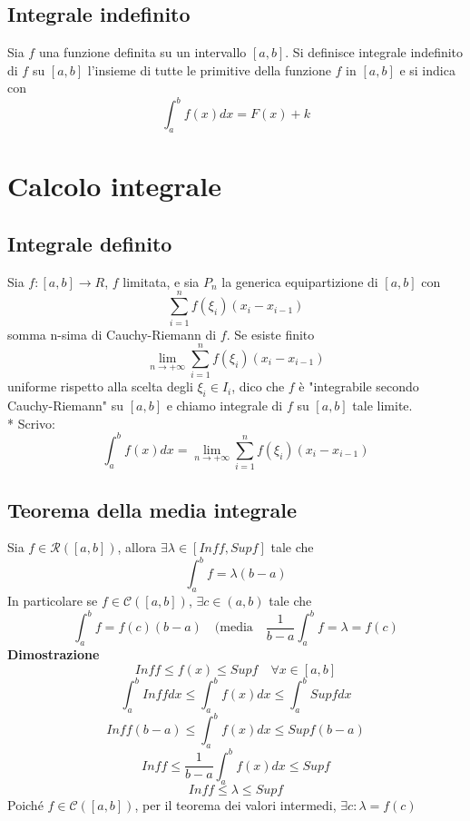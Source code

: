 \documentclass[12pt]{article}
\begin{document}
\subsection{Integrale indefinito}
Sia $f$ una funzione definita su un intervallo $[a,b]$. Si definisce integrale indefinito di $f$ su $[a,b]$ l'insieme di tutte le primitive della funzione $f$ in $[a,b]$ e si indica con 
\[\int_a^b f(x)dx = F(x) + k\]

\section{Calcolo integrale}

\subsection{Integrale definito}
Sia $f:[a,b] \to R$, $f$ limitata, e sia $P_n$ la generica equipartizione di $[a,b]$ con 
\[ \sum_{i = 1}^{n}f(\xi_i)(x_i-x_{i-1})\]
somma n-sima di Cauchy-Riemann di $f$. Se esiste finito \[ \lim_{n \to +\infty} \sum_{i = 1}^{n}f(\xi_i)(x_i-x_{i-1})\]
uniforme rispetto alla scelta degli $\xi_i \in I_i$, dico che $f$ è "integrabile secondo Cauchy-Riemann" su $[a,b]$ e chiamo integrale di $f$ su $[a,b]$ tale limite.\\*
Scrivo: 
\[\displaystyle \int_{a}^{b} f(x)dx = \lim_{n \to +\infty} \sum_{i = 1}^{n}f(\xi_i)(x_i-x_{i-1})\]

\subsection{Teorema della media integrale}
Sia $f \in \mathscr{R}([a,b])$, allora $\exists \lambda \in [Inff, Supf]$ tale che 
\[
\int_{a}^{b}f = \lambda(b-a)\]
In particolare se $f \in \mathscr{C}([a,b])$, $\exists c \in (a,b)$ tale che
\[ \int_{a}^{b} f = f(c)(b-a) \quad ( \text{media} \quad \frac{1}{b-a}\int_{a}^{b} f = \lambda =f(c)\]
\newpage
\textbf{Dimostrazione}
\[Inff \leq f(x) \leq Supf \quad \forall x \in [a,b]\]
\[\int_{a}^{b} Inff dx \leq \int_{a}^{b} f(x) dx \leq \int_{a}^{b} Supf dx\]
\[Inff(b-a) \leq \int_{a}^{b} f(x) dx \leq Supf (b-a)\]
\[Inff \leq \frac{1}{b-a} \int_{a}^{b} f(x) dx \leq Supf\]
\[Inff \leq \lambda \leq Supf\]
Poiché $f \in \mathscr{C}([a,b])$, per il teorema dei valori intermedi, $\exists c: \lambda = f(c)$
\end{document}
